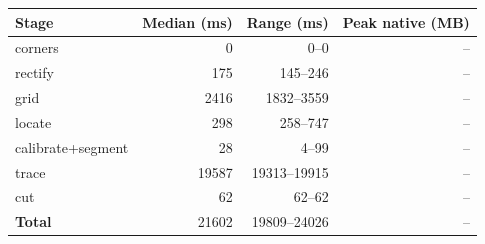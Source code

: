 \begin{tabular}{@{}lrrr@{}}
\toprule
\textbf{Stage} & \textbf{Median (ms)} & \textbf{Range (ms)} & \textbf{Peak native (MB)}\\
\midrule
corners & 0 & 0--0 & --\\
rectify & 175 & 145--246 & --\\
grid & 2416 & 1832--3559 & --\\
locate & 298 & 258--747 & --\\
calibrate+segment & 28 & 4--99 & --\\
trace & 19587 & 19313--19915 & --\\
cut & 62 & 62--62 & --\\
\midrule
\textbf{Total} & 21602 & 19809--24026 & --\\
\bottomrule
\end{tabular}
